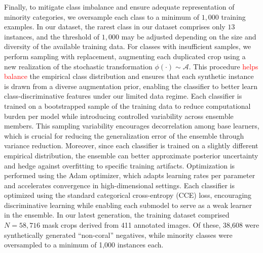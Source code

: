 \documentclass[11pt]{elsarticle}
\newcommand{\revadd}[1]{\textcolor{red}{#1}}
\newcommand{\revdel}[1]{%
  \sbox\revdelbox{#1}%
  \makebox[0pt][l]{\raisebox{0.45ex}{\rule{\wd\revdelbox}{0.4pt}}}\usebox\revdelbox
}
\begin{document}
Finally, to mitigate class imbalance and ensure adequate representation of minority categories, we oversample each class to a minimum of $1{,}000$ training examples. In our dataset, the rarest class in our dataset comprises only $13$ instances, and the threshold of $1,000$ may be adjusted depending on the size and diversity of the available training data. For classes with insufficient samples, we perform sampling with replacement, augmenting each duplicated crop using a new realization of the stochastic transformation $\phi(\cdot) \sim \mathcal{A}$. This procedure \revdel{helps balances}\revadd{helps balance} the empirical class distribution and ensures that each synthetic instance is drawn from a diverse augmentation prior, enabling the classifier to better learn class-discriminative features under our limited data regime. Each classifier is trained on a bootstrapped sample of the training data to reduce computational burden per model while introducing controlled variability across ensemble members. This sampling variability encourages decorrelation among base learners, which is crucial for reducing the generalization error of the ensemble through variance reduction. Moreover, since each classifier is trained on a slightly different empirical distribution, the ensemble can better approximate posterior uncertainty and hedge against overfitting to specific training artifacts. Optimization is performed using the Adam optimizer, which adapts learning rates per parameter and accelerates convergence in high-dimensional settings. Each classifier is optimized using the standard categorical cross-entropy (CCE) loss, encouraging discriminative learning while enabling each submodel to serve as a weak learner in the ensemble.  In our latest generation, the training dataset comprised $N=58{,}716$ mask crops derived from 411 annotated images. Of these, 38,608 were synthetically generated ``non-coral'' negatives, while minority classes were oversampled to a minimum of 1,000 instances each.
\end{document}
